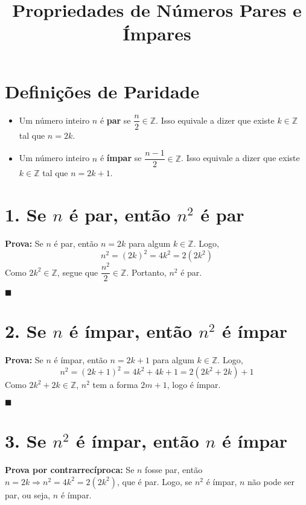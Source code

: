 \documentclass[12pt]{article}
\title{Propriedades de Números Pares e Ímpares}
\author{}
\date{}
\begin{document}
\maketitle

\section*{Definições de Paridade}

\begin{itemize}
    \item Um número inteiro \( n \) é \textbf{par} se \( \dfrac{n}{2} \in \mathbb{Z} \). Isso equivale a dizer que existe \( k \in \mathbb{Z} \) tal que \( n = 2k \).
    \item Um número inteiro \( n \) é \textbf{ímpar} se \( \dfrac{n - 1}{2} \in \mathbb{Z} \). Isso equivale a dizer que existe \( k \in \mathbb{Z} \) tal que \( n = 2k + 1 \).
\end{itemize}

\section*{1. Se \( n \) é par, então \( n^2 \) é par}

\textbf{Prova:}  
Se \( n \) é par, então \( n = 2k \) para algum \( k \in \mathbb{Z} \).  
Logo,
\[
n^2 = (2k)^2 = 4k^2 = 2(2k^2)
\]
Como \( 2k^2 \in \mathbb{Z} \), segue que \( \dfrac{n^2}{2} \in \mathbb{Z} \).  
Portanto, \( n^2 \) é par.

\hfill\(\blacksquare\)

\section*{2. Se \( n \) é ímpar, então \( n^2 \) é ímpar}

\textbf{Prova:}  
Se \( n \) é ímpar, então \( n = 2k + 1 \) para algum \( k \in \mathbb{Z} \).  
Logo,
\[
n^2 = (2k + 1)^2 = 4k^2 + 4k + 1 = 2(2k^2 + 2k) + 1
\]
Como \( 2k^2 + 2k \in \mathbb{Z} \), \( n^2 \) tem a forma \( 2m + 1 \), logo é ímpar.

\hfill\(\blacksquare\)

\section*{3. Se \( n^2 \) é ímpar, então \( n \) é ímpar}

\textbf{Prova por contrarrecíproca:}  
Se \( n \) fosse par, então \( n = 2k \Rightarrow n^2 = 4k^2 = 2(2k^2) \), que é par.  
Logo, se \( n^2 \) é ímpar, \( n \) não pode ser par, ou seja, \( n \) é ímpar.
\end{document}
